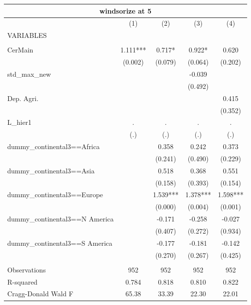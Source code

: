 \documentclass[12pt,a4paper]{article}
\begin{document}
\begin{tabular}{lcccc}
\multicolumn{5}{c}{windsorize at 5} \\ \hline
 & (1) & (2) & (3) & (4) \\
VARIABLES &  &  &  &  \\ \hline
 &  &  &  &  \\
CerMain & 1.111*** & 0.717* & 0.922* & 0.620 \\
 & (0.002) & (0.079) & (0.064) & (0.202) \\
std\_max\_new &  &  & -0.039 &  \\
 &  &  & (0.492) &  \\
Dep. Agri. &  &  &  & 0.415 \\
 &  &  &  & (0.352) \\
L\_hier1 & . & . & . & . \\
 & (.) & (.) & (.) & (.) \\
dummy\_continental3==Africa &  & 0.358 & 0.242 & 0.373 \\
 &  & (0.241) & (0.490) & (0.229) \\
dummy\_continental3==Asia &  & 0.518 & 0.368 & 0.551 \\
 &  & (0.158) & (0.393) & (0.154) \\
dummy\_continental3==Europe &  & 1.539*** & 1.378*** & 1.598*** \\
 &  & (0.000) & (0.004) & (0.001) \\
dummy\_continental3==N America &  & -0.171 & -0.258 & -0.027 \\
 &  & (0.407) & (0.272) & (0.934) \\
dummy\_continental3==S America &  & -0.177 & -0.181 & -0.142 \\
 &  & (0.270) & (0.267) & (0.425) \\
 &  &  &  &  \\
Observations & 952 & 952 & 952 & 952 \\
R-squared & 0.784 & 0.818 & 0.810 & 0.822 \\
 Cragg-Donald Wald F & 65.38 & 33.39 & 22.30 & 22.01 \\ \hline
\end{tabular}
\end{document}
